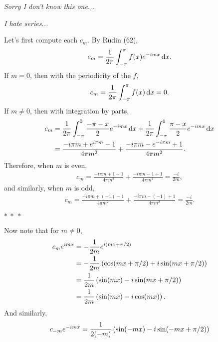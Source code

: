 \documentclass[12pt]{article}
\begin{document}
\begin{fproof}[2(a)]
 \textit{Sorry I don't know this one...}
\end{fproof}

\begin{fproof}[2(b)]
 \textit{I hate series...}
\end{fproof}
\newpage

\begin{fproof}[3(a)]
 Let's first compute each \(c_m\).
 By Rudin (62),
 \begin{align*}
   c_m 
   = \frac{1}{2\pi} \int_{-\pi}^{\pi} f(x) e^{-imx} \mathop{}\!\mathrm{d} x.
 \end{align*}
 If \(m = 0\), then with the periodicity of the \(f\),
 \begin{align*}
   c_m = \frac{1}{2 \pi} \int_{-\pi}^{\pi} f(x) \mathop{}\!\mathrm{d} x = 0.
 \end{align*}
 If \(m \neq 0\), then with integration by parts,
 \begin{align*}
   c_m 
   &= \frac{1}{2\pi} \int_{-\pi}^{0} \frac{-\pi-x}{2} e^{-imx} \mathop{}\!\mathrm{d} x + \frac{1}{2\pi} \int_{-\pi}^{0} \frac{\pi-x}{2} e^{-imx} \mathop{}\!\mathrm{d} x\\
   & = \frac{-i\pi m +e^{i\pi m} - 1}{4 \pi m^2} + \frac{-i\pi m - e^{-i\pi m} + 1}{4 \pi m^2}.
 \end{align*}
 Therefore, when \(m\) is even,
 \begin{align*}
   c_m = \frac{-i \pi m + 1 - 1}{4 \pi m^2} + \frac{-i \pi m - 1 + 1}{4 \pi m^2} = \frac{-i}{2m},
 \end{align*}
 and similarly, when \(m\) is odd,
 \begin{align*}
   c_m = \frac{-i \pi m + (-1) - 1}{4 \pi m^2} + \frac{-i \pi m - (-1) + 1}{4 \pi m^2} = \frac{-i}{2m}.
 \end{align*}
 \begin{center}
   \(\ast~\ast~\ast\)
 \end{center}
 Now note that for \(m \neq 0\),
 \begin{align*}
   c_m e^{imx}
   &= -\frac{1}{2m}e^{i(mx + \pi/2)}\\
   &= -\frac{1}{2m} \left( \cos(mx + \pi/2) + i \sin(mx + \pi/2) \right)\\
   &= \frac{1}{2m} \left( \sin(mx) - i \sin(mx + \pi/2) \right)\\
   &= \frac{1}{2m} \left( \sin(mx) - i\cos(mx) \right).
 \end{align*}
 And similarly,
 \begin{align*}
   c_{-m}e^{-imx}
   & = \frac{1}{2(-m)}\pare{\sin(-mx) - i\sin(-mx + \pi/2)}\\

\end{align*}
\end{fproof}
\end{document}
